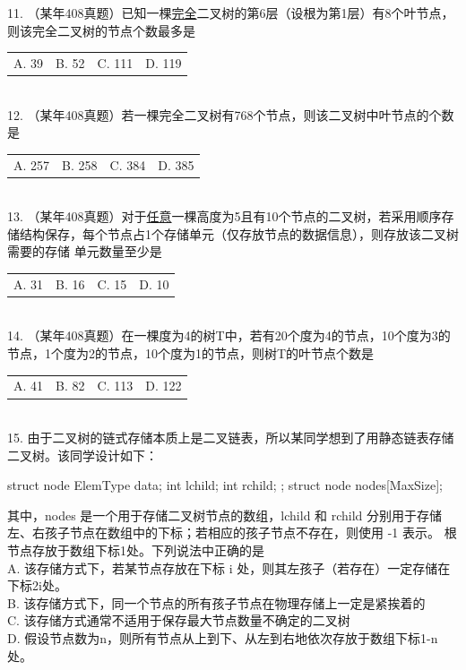 \begin{exercise}
11. （某年408真题）已知一棵\uline{完全}二叉树的第6层（设根为第1层）有8个叶节点，则该完全二叉树的节点个数最多是\underline{\hspace{1cm}}\\[0.3em]
\begin{tabular}{llll}
A. 39 & B. 52 & C. 111 & D. 119
\end{tabular}\\

12. （某年408真题）若一棵完全二叉树有768个节点，则该二叉树中叶节点的个数是\underline{\hspace{1cm}}\\[0.3em]
\begin{tabular}{llll}
A. 257 & B. 258 & C. 384 & D. 385
\end{tabular}\\

13. （某年408真题）对于\uline{任意}一棵高度为5且有10个节点的二叉树，若采用顺序存储结构保存，每个节点占1个存储单元（仅存放节点的数据信息），则存放该二叉树需要的存储
单元数量至少是\underline{\hspace{1cm}}\\[0.3em]
\begin{tabular}{llll}
A. 31 & B. 16 & C. 15 & D. 10
\end{tabular}\\

14. （某年408真题）在一棵度为4的树T中，若有20个度为4的节点，10个度为3的节点，1个度为2的节点，10个度为1的节点，则树T的叶节点个数是\underline{\hspace{1cm}}\\[0.5em]
\begin{tabular}{llll}
A. 41 & B. 82 & C. 113 & D. 122
\end{tabular}\\

15. 由于二叉树的链式存储本质上是二叉链表，所以某同学想到了用静态链表存储二叉树。该同学设计如下：
\begin{cppcodeNum}
struct node {
    ElemType data;
    int lchild; 
    int rchild; 
};
struct node nodes[MaxSize];
\end{cppcodeNum}
其中，nodes 是一个用于存储二叉树节点的数组，lchild 和 rchild 分别用于存储左、右孩子节点在数组中的下标；若相应的孩子节点不存在，则使用 -1 表示。
根节点存放于数组下标1处。下列说法中正确的是\underline{\hspace{1cm}}\\[0.5em]
A. 该存储方式下，若某节点存放在下标 i 处，则其左孩子（若存在）一定存储在下标2i处。\\
B. 该存储方式下，同一个节点的所有孩子节点在物理存储上一定是紧挨着的\\
C. 该存储方式通常不适用于保存最大节点数量不确定的二叉树\\
D. 假设节点数为n，则所有节点从上到下、从左到右地依次存放于数组下标1-n处。\\


\end{exercise}
